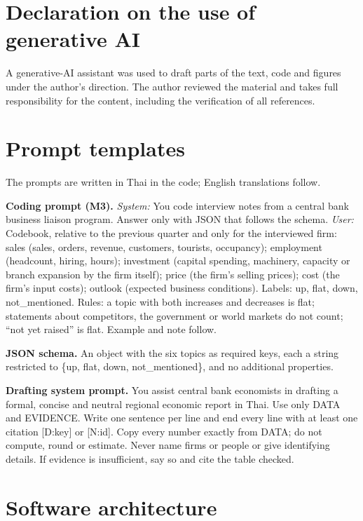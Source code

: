 \documentclass[11pt]{article}
\begin{document}
\section*{Declaration on the use of generative AI}
A generative-AI assistant was used to draft parts of the text, code and figures under the author's direction. The author reviewed the material and takes full responsibility for the content, including the verification of all references.




\appendix
\section{Prompt templates}\label{app:prompts}
The prompts are written in Thai in the code; English translations follow.

\textbf{Coding prompt (M3).} \textit{System:} You code interview notes from a central bank business liaison program. Answer only with JSON that follows the schema. \textit{User:} Codebook, relative to the previous quarter and only for the interviewed firm: sales (sales, orders, revenue, customers, tourists, occupancy); employment (headcount, hiring, hours); investment (capital spending, machinery, capacity or branch expansion by the firm itself); price (the firm's selling prices); cost (the firm's input costs); outlook (expected business conditions). Labels: up, flat, down, not\_mentioned. Rules: a topic with both increases and decreases is flat; statements about competitors, the government or world markets do not count; ``not yet raised'' is flat. Example and note follow.

\textbf{JSON schema.} An object with the six topics as required keys, each a string restricted to \{up, flat, down, not\_mentioned\}, and no additional properties.

\textbf{Drafting system prompt.} You assist central bank economists in drafting a formal, concise and neutral regional economic report in Thai. Use only DATA and EVIDENCE. Write one sentence per line and end every line with at least one citation [D:key] or [N:id]. Copy every number exactly from DATA; do not compute, round or estimate. Never name firms or people or give identifying details. If evidence is insufficient, say so and cite the table checked.

\section{Software architecture}\label{app:software}
\end{document}
